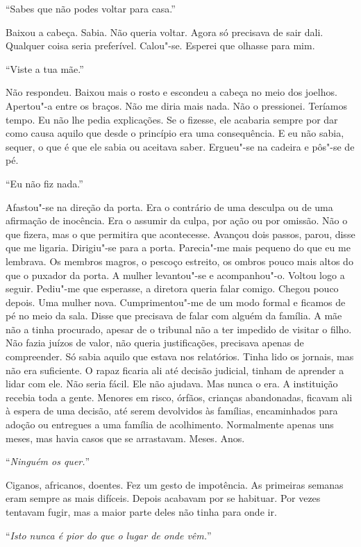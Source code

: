 ``Sabes que não podes voltar para casa.''

Baixou a cabeça. Sabia. Não queria voltar. Agora só precisava de sair
dali. Qualquer coisa seria preferível. Calou"-se. Esperei que olhasse
para mim.

``Viste a tua mãe.''

Não respondeu. Baixou mais o rosto e escondeu a cabeça no meio dos
joelhos. Apertou"-a entre os braços. Não me diria mais nada. Não o
pressionei. Teríamos tempo. Eu não lhe pedia explicações. Se o fizesse,
ele acabaria sempre por dar como causa aquilo que desde o princípio era
uma consequência. E eu não sabia, sequer, o que é que ele sabia ou
aceitava saber. Ergueu"-se na cadeira e pôs"-se de pé.

``Eu não fiz nada.''

Afastou"-se na direção da porta. Era o contrário de uma desculpa ou de
uma afirmação de inocência. Era o assumir da culpa, por ação ou por
omissão. Não o que fizera, mas o que permitira que acontecesse. Avançou
dois passos, parou, disse que me ligaria. Dirigiu"-se para a porta.
Parecia"-me mais pequeno do que eu me lembrava. Os membros magros, o
pescoço estreito, os ombros pouco mais altos do que o puxador da porta.
A mulher levantou"-se e acompanhou"-o. Voltou logo a seguir. Pediu"-me
que esperasse, a diretora queria falar comigo. Chegou pouco depois. Uma
mulher nova. Cumprimentou"-me de um modo formal e ficamos de pé no meio
da sala. Disse que precisava de falar com alguém da família. A mãe não a
tinha procurado, apesar de o tribunal não a ter impedido de visitar o
filho. Não fazia juízos de valor, não queria justificações, precisava
apenas de compreender. Só sabia aquilo que estava nos relatórios. Tinha
lido os jornais, mas não era suficiente. O rapaz ficaria ali até decisão
judicial, tinham de aprender a lidar com ele. Não seria fácil. Ele não
ajudava. Mas nunca o era. A instituição recebia toda a gente. Menores em
risco, órfãos, crianças abandonadas, ficavam ali à espera de uma
decisão, até serem devolvidos às famílias, encaminhados para adoção ou
entregues a uma família de acolhimento. Normalmente apenas uns meses,
mas havia casos que se arrastavam. Meses. Anos.

``\emph{Ninguém os quer.}''

Ciganos, africanos, doentes. Fez um gesto de impotência. As primeiras
semanas eram sempre as mais difíceis. Depois acabavam por se habituar.
Por vezes tentavam fugir, mas a maior parte deles não tinha para onde
ir.

``\emph{Isto nunca é pior do que o lugar de onde vêm.}''

